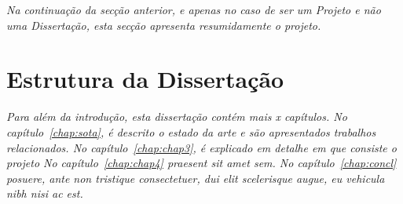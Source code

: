 \emph{
Na continuação da secção anterior, e apenas no caso de ser um Projeto
e não uma Dissertação, esta secção apresenta resumidamente o projeto.}


\section{Estrutura da Dissertação} \label{sec:struct}

\emph{Para além da introdução, esta dissertação contém mais x capítulos.
No capítulo~\ref{chap:sota}, é descrito o estado da arte e são
apresentados trabalhos relacionados.
No capítulo~\ref{chap:chap3}, é explicado em detalhe em que consiste o projeto
No capítulo~\ref{chap:chap4} praesent sit amet sem. 
No capítulo~\ref{chap:concl}  posuere, ante non tristique
consectetuer, dui elit scelerisque augue, eu vehicula nibh nisi ac
est. 
}